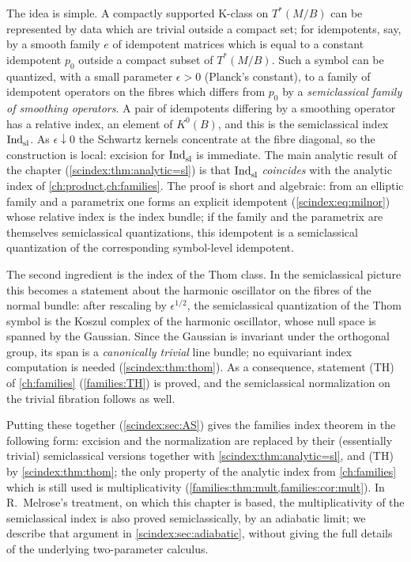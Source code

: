 The idea is simple. A compactly supported K-class on $T^*(M/B)$ can be
represented by data which are trivial outside a compact set; for idempotents,
say, by a smooth family $e$ of idempotent matrices which is equal to a constant
idempotent $p_0$ outside a compact subset of $T^*(M/B)$. Such a symbol can be
quantized, with a small parameter $\epsilon>0$ (Planck's constant), to a
family of idempotent operators on the fibres which differs from $p_0$ by a
\emph{semiclassical family of smoothing operators}. A pair of idempotents
differing by a smoothing operator has a relative index, an element of $K^0(B)$,
and this is the semiclassical index $\operatorname{Ind}^{}_{\mathrm{sl}}$. As $\epsilon\downarrow0$ the
Schwartz kernels concentrate at the fibre diagonal, so the construction is
local: excision for $\operatorname{Ind}^{}_{\mathrm{sl}}$ is immediate. The main analytic result of the
chapter (\cref{scindex:thm:analytic=sl}) is that $\operatorname{Ind}^{}_{\mathrm{sl}}$ \emph{coincides} with
the analytic index of \cref{ch:product,ch:families}. The proof is short and
algebraic: from an elliptic family and a parametrix one forms an explicit
idempotent (\eqref{scindex:eq:milnor}) whose relative index is the index bundle;
if the family and the parametrix are themselves semiclassical quantizations, this
idempotent is a semiclassical quantization of the corresponding symbol-level
idempotent.

The second ingredient is the index of the Thom class. In the semiclassical
picture this becomes a statement about the harmonic oscillator on the fibres of
the normal bundle: after rescaling by $\epsilon^{1/2}$, the semiclassical
quantization of the Thom symbol is the Koszul complex of the harmonic
oscillator, whose null space is spanned by the Gaussian. Since the Gaussian is
invariant under the orthogonal group, its span is a \emph{canonically trivial}
line bundle; no equivariant index computation is needed
(\cref{scindex:thm:thom}). As a consequence, statement (TH) of
\cref{ch:families} (\ref{families:TH}) is proved, and the semiclassical normalization on the trivial
fibration follows as well.

Putting these together (\cref{scindex:sec:AS}) gives the families index theorem
in the following form: excision and the normalization are replaced by their
(essentially trivial) semiclassical versions together with
\cref{scindex:thm:analytic=sl}, and (TH) by \cref{scindex:thm:thom}; the only
property of the analytic index from \cref{ch:families} which is still used is
multiplicativity (\cref{families:thm:mult,families:cor:mult}). In R.~Melrose's treatment, on which this chapter is based, the
multiplicativity of the semiclassical index is also proved semiclassically, by an
adiabatic limit; we describe that argument in
\cref{scindex:sec:adiabatic}, without giving the full details of the
underlying two-parameter calculus.

